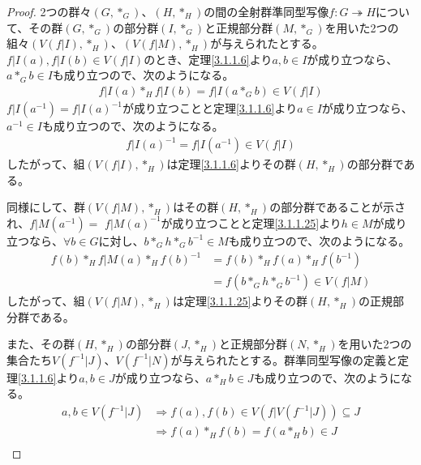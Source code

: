 \documentclass[dvipdfmx]{jsarticle}
\begin{document}
\begin{proof}
2つの群々$\left( G,*_{G} \right)$、$\left( H,*_{H} \right)$の間の全射群準同型写像$f:G \twoheadrightarrow H$について、その群$\left( G,*_{G} \right)$の部分群$\left( I,*_{G} \right)$と正規部分群$\left( M,*_{G} \right)$を用いた2つの組々$\left( V\left( f|I \right),*_{H} \right)$、$\left( V\left( f|M \right),*_{H} \right)$が与えられたとする。$f|I(a),f|I(b) \in V\left( f|I \right)$のとき、定理\ref{3.1.1.6}より$a,b \in I$が成り立つなら、$a*_{G}b \in I$も成り立つので、次のようになる。
\begin{align*}
f|I(a)*_{H}f|I(b) = f|I\left( a*_{G}b \right) \in V\left( f|I \right)
\end{align*}
$f|I\left( a^{- 1} \right) = {f|I(a)}^{- 1}$が成り立つことと定理\ref{3.1.1.6}より$a \in I$が成り立つなら、$a^{- 1} \in I$も成り立つので、次のようになる。
\begin{align*}
{f|I(a)}^{- 1} = f|I\left( a^{- 1} \right) \in V\left( f|I \right)
\end{align*}
したがって、組$\left( V\left( f|I \right),*_{H} \right)$は定理\ref{3.1.1.6}よりその群$\left( H,*_{H} \right)$の部分群である。\par
同様にして、群$\left( V\left( f|M \right),*_{H} \right)$はその群$\left( H,*_{H} \right)$の部分群であることが示され、$f|M\left( a^{- 1} \right) =$
${f|M(a)}^{- 1}$が成り立つことと定理\ref{3.1.1.25}より$h \in M$が成り立つなら、$\forall b \in G$に対し、$b*_{G}h*_{G}b^{- 1} \in M$も成り立つので、次のようになる。
\begin{align*}
f(b)*_{H}f|M(a)*_{H}{f(b)}^{- 1} &= f(b)*_{H}f(a)*_{H}f\left( b^{- 1} \right)\\
&= f\left( b*_{G}h*_{G}b^{- 1} \right) \in V\left( f|M \right)
\end{align*}
したがって、組$\left( V\left( f|M \right),*_{H} \right)$は定理\ref{3.1.1.25}よりその群$\left( H,*_{H} \right)$の正規部分群である。\par
また、その群$\left( H,*_{H} \right)$の部分群$\left( J,*_{H} \right)$と正規部分群$\left( N,*_{H} \right)$を用いた2つの集合たち$V\left( f^{- 1}|J \right)$、$V\left( f^{- 1}|N \right)$が与えられたとする。群準同型写像の定義と定理\ref{3.1.1.6}より$a,b \in J$が成り立つなら、$a*_{H}b \in J$も成り立つので、次のようになる。
\begin{align*}
a,b \in V\left( f^{- 1}|J \right) &\Rightarrow f(a),f(b) \in V\left( f|V\left( f^{- 1}|J \right) \right) \subseteq J\\
&\Rightarrow f(a)*_{H}f(b) = f\left( a*_{H}b \right) \in J\\

\end{align*}
\end{proof}
\end{document}
